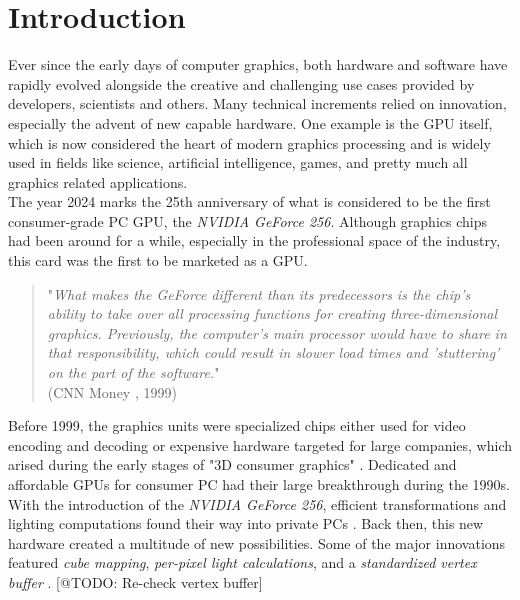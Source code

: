 \chapter{Introduction} \label{cpt-introduction}

Ever since the early days of computer graphics, both hardware and software have rapidly evolved
alongside the creative and challenging use cases provided by developers, scientists and others.
Many technical increments relied on innovation, especially the advent of new capable hardware.
One example is the \ac{GPU} itself, which is now considered the heart of modern graphics 
processing and is widely used in fields like science, artificial intelligence, games, and pretty 
much all graphics related applications. \\

\noindent
The year 2024 marks the 25th anniversary of what is considered to be the first consumer-grade PC 
\ac{GPU}, the \emph{NVIDIA GeForce 256}. Although graphics chips had been around for a while, 
especially in the professional space of the industry, this card was the first to be marketed 
as a \ac{GPU}. 

\begin{quote}
    "\emph{What makes the GeForce different than its predecessors is the chip's ability to take over all 
    processing functions for creating three-dimensional graphics. Previously, the computer's main 
    processor would have to share in that responsibility, which could result in slower load times 
    and 'stuttering' on the part of the software.}" \\  
    (CNN Money \cite{CNNMoney1999}, 1999)
\end{quote}

\noindent
Before 1999, the graphics units were specialized chips either used for video encoding and decoding
or expensive hardware targeted for large companies, which arised during the early stages of "3D 
consumer graphics" \cite{Singer2023}. Dedicated and affordable \ac{GPU}s for consumer \ac{PC} had 
their large breakthrough during the 1990s. With the introduction of the \emph{NVIDIA GeForce 256}, 
efficient transformations and lighting computations found their way into private \ac{PC}s 
\cite{Fenno2024}. Back then, this new hardware created a multitude of new possibilities. Some of the 
major innovations featured \emph{cube mapping}, \emph{per-pixel light calculations}, and a 
\emph{standardized vertex buffer} \cite{NVIDIA1999, Battaglia2024}. [@TODO: Re-check vertex buffer] \\

